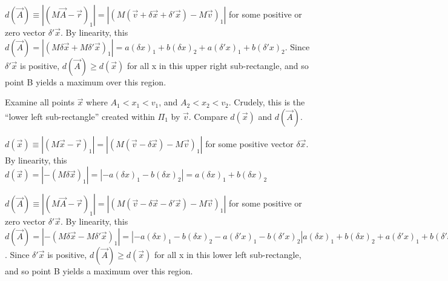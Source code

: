 \documentclass[a4paper,10pt]{article}
\begin{document}
$d(\vec{A}) \equiv |(M\vec{A} - \vec{r})_1| = |(M(\vec{v} + \delta\vec{x} + \delta'\vec{x}) - M\vec{v})_1|$ for some positive or zero vector $\delta'\vec{x}$.  By linearity, this
$d(\vec{A}) = |(M\delta\vec{x} + M\delta'\vec{x})_1| = a(\delta{x})_1 + b(\delta{x})_2 + a(\delta'{x})_1 + b(\delta'{x})_2$.  Since $\delta'\vec{x}$
is positive, $d(\vec{A}) \geq d(\vec{x})$ for all x in this upper right sub-rectangle, and so point B yields a maximum over this region.

Examine all points $\vec{x}$ where $A_1 < x_1 < v_1$, and $A_2 < x_2 < v_2$.  Crudely, this is the ``lower left sub-rectangle'' 
created within $\varPi_1$ by $\vec{v}$.  Compare $d(\vec{x})$ and $d(\vec{A})$.

$d(\vec{x}) \equiv |(M\vec{x} - \vec{r})_1| = |(M(\vec{v} - \delta\vec{x}) - M\vec{v})_1|$ for some positive vector $\delta\vec{x}$.  By linearity, this
$d(\vec{x}) = |- (M\delta\vec{x})_1| = |- a(\delta{x})_1 - b(\delta{x})_2| = a(\delta{x})_1 + b(\delta{x})_2$ 

$d(\vec{A}) \equiv |(M\vec{A} - \vec{r})_1| = |(M(\vec{v} - \delta\vec{x} - \delta'\vec{x}) - M\vec{v})_1|$ for some positive or zero vector $\delta'\vec{x}$.  By linearity, this
$d(\vec{A}) = |-(M\delta\vec{x} - M\delta'\vec{x})_1| = |-a(\delta{x})_1 - b(\delta{x})_2 - a(\delta'{x})_1 - b(\delta'{x})_2| a(\delta{x})_1 + b(\delta{x})_2 + a(\delta'{x})_1 + b(\delta'{x})_2$.  Since $\delta'\vec{x}$
is positive, $d(\vec{A}) \geq d(\vec{x})$ for all x in this lower left sub-rectangle, and so point B yields a maximum over this region.
\end{document}
